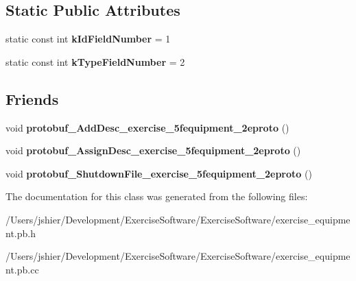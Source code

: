 \subsection*{Static Public Attributes}
\begin{DoxyCompactItemize}
\item 
\hypertarget{classexercise__protobuf_1_1_equipment_a5e646568504125c15d9e7097aa061c9e}{}static const int {\bfseries k\+Id\+Field\+Number} = 1\label{classexercise__protobuf_1_1_equipment_a5e646568504125c15d9e7097aa061c9e}

\item 
\hypertarget{classexercise__protobuf_1_1_equipment_a3c28ba0b445abab11d6a6c948d622a1c}{}static const int {\bfseries k\+Type\+Field\+Number} = 2\label{classexercise__protobuf_1_1_equipment_a3c28ba0b445abab11d6a6c948d622a1c}

\end{DoxyCompactItemize}
\subsection*{Friends}
\begin{DoxyCompactItemize}
\item 
\hypertarget{classexercise__protobuf_1_1_equipment_ab643513d59abee7e930172a51104e178}{}void {\bfseries protobuf\+\_\+\+Add\+Desc\+\_\+exercise\+\_\+5fequipment\+\_\+2eproto} ()\label{classexercise__protobuf_1_1_equipment_ab643513d59abee7e930172a51104e178}

\item 
\hypertarget{classexercise__protobuf_1_1_equipment_aa2ddf289362adb3ea15b10dee7c74676}{}void {\bfseries protobuf\+\_\+\+Assign\+Desc\+\_\+exercise\+\_\+5fequipment\+\_\+2eproto} ()\label{classexercise__protobuf_1_1_equipment_aa2ddf289362adb3ea15b10dee7c74676}

\item 
\hypertarget{classexercise__protobuf_1_1_equipment_a04b681f62a7ad9cafa043f7d5a95e743}{}void {\bfseries protobuf\+\_\+\+Shutdown\+File\+\_\+exercise\+\_\+5fequipment\+\_\+2eproto} ()\label{classexercise__protobuf_1_1_equipment_a04b681f62a7ad9cafa043f7d5a95e743}

\end{DoxyCompactItemize}


The documentation for this class was generated from the following files\+:\begin{DoxyCompactItemize}
\item 
/\+Users/jshier/\+Development/\+Exercise\+Software/\+Exercise\+Software/exercise\+\_\+equipment.\+pb.\+h\item 
/\+Users/jshier/\+Development/\+Exercise\+Software/\+Exercise\+Software/exercise\+\_\+equipment.\+pb.\+cc\end{DoxyCompactItemize}
